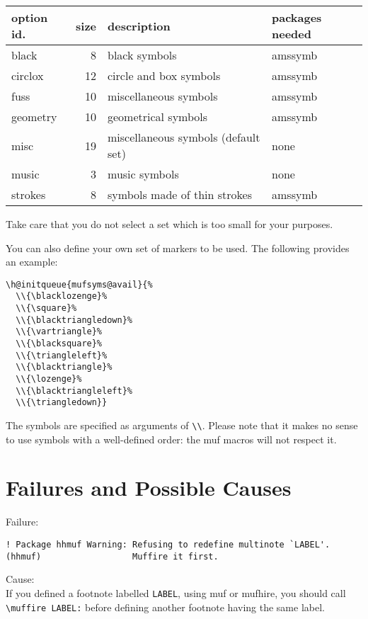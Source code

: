 \documentclass[11pt]{article}
\makeatletter
\def\packagename#1{{\sffamily #1}}     %
\def\macroname#1{{\ttfamily\@ttbs#1}}  %
\def\={\verb=}
\def\<#1>{\macroname{#1}}
\makeatother
\begin{document}
\begin{tabular}{lrll}\hline
option id. & size & description & packages needed\\\hline
black    &  8 & black symbols                      & \packagename{amssymb} \\
circlox  & 12 & circle and box symbols             & \packagename{amssymb} \\
fuss     & 10 & miscellaneous symbols              & \packagename{amssymb} \\
geometry & 10 & geometrical symbols                & \packagename{amssymb} \\
misc     & 19 & miscellaneous symbols (default set)& none                  \\
music    &  3 & music symbols                      & none                  \\
strokes  &  8 & symbols made of thin strokes       & \packagename{amssymb} \\
\hline\end{tabular}

Take care that you do not select a set which is too small for your purposes.

You can also define your own set of markers to be used. The following
provides an example:
\begin{verbatim}
\h@initqueue{mufsyms@avail}{%
  \\{\blacklozenge}%
  \\{\square}%
  \\{\blacktriangledown}%
  \\{\vartriangle}%
  \\{\blacksquare}%
  \\{\triangleleft}%
  \\{\blacktriangle}%
  \\{\lozenge}%
  \\{\blacktriangleleft}%
  \\{\triangledown}}
\end{verbatim}

The symbols are specified as arguments of \=\\=.
Please note that it makes no sense to use symbols with a well-defined
order: the muf macros will not respect it.

\section{Failures and Possible Causes}

Failure:
\begin{verbatim}
! Package hhmuf Warning: Refusing to redefine multinote `LABEL'.
(hhmuf)                  Muffire it first.
\end{verbatim}
Cause:\\
If you defined a footnote labelled \=LABEL=, using \<muf> or \<mufhire>,
you should call \=\muffire LABEL:= before defining another footnote having
the same label.
\end{document}

